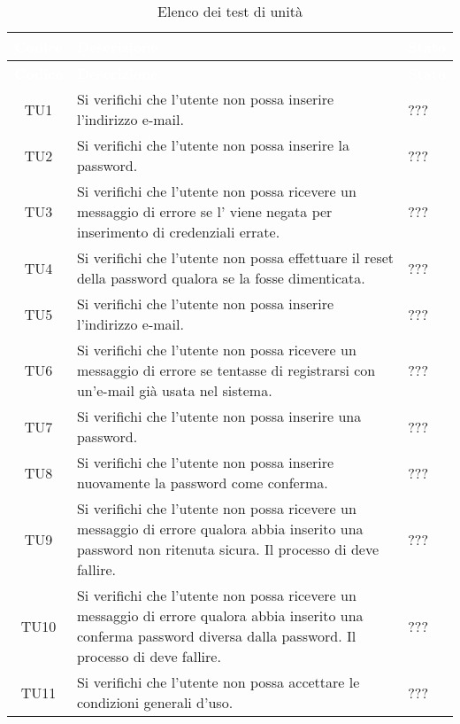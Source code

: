 {
\renewcommand{\arraystretch}{1.5}
\centering
\begin{longtable}{ c  C{9cm} C{1cm}}
\caption{Elenco dei test di unità}\\
\textcolor{white}{\textbf{Codice}} & \textcolor{white}{\textbf{Descrizione}} & \textcolor{white}{\textbf{Stato}}\\
\endfirsthead
{}
\textcolor{white}{\textbf{Codice}} & \textcolor{white}{\textbf{Descrizione}} & \textcolor{white}{\textbf{Stato}}\\
\endhead

TU1 & Si verifichi che l'utente non  possa inserire l'indirizzo e-mail. & ??? \\
TU2 & Si verifichi che l'utente non  possa inserire la password. & ??? \\
TU3 & Si verifichi che l'utente non  possa ricevere un messaggio di errore se l' viene negata per inserimento di credenziali errate. & ??? \\
TU4 & Si verifichi che l'utente non  possa effettuare il reset della password qualora se la fosse dimenticata. & ??? \\
TU5 & Si verifichi che l’utente non  possa inserire l'indirizzo e-mail. & ??? \\
TU6 & Si verifichi che l’utente non  possa ricevere un messaggio di errore se tentasse di registrarsi con un'e-mail già usata nel sistema.  & ??? \\
TU7 & Si verifichi che l’utente non  possa inserire una password. & ??? \\
TU8 & Si verifichi che l’utente non  possa inserire nuovamente la password come conferma. & ??? \\
TU9 & Si verifichi che l’utente non  possa ricevere un messaggio di errore qualora abbia inserito una password non ritenuta sicura. Il processo di  deve fallire. & ??? \\
TU10 & Si verifichi che l’utente non  possa ricevere un messaggio di errore qualora abbia inserito una conferma password diversa dalla password. Il processo di  deve fallire. & ??? \\
TU11 & Si verifichi che l’utente non  possa accettare le condizioni generali d'uso. & ??? \\

\end{longtable}}
